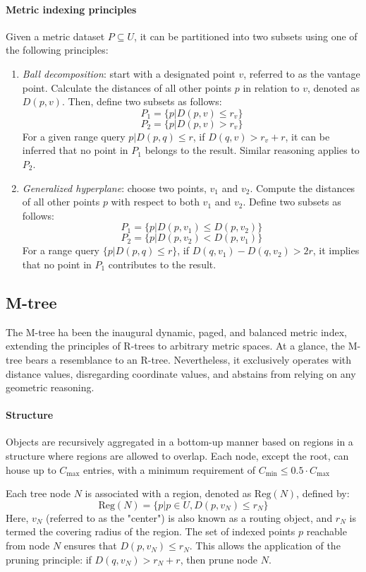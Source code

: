 \paragraph*{Metric indexing principles}
Given a metric dataset $P \subseteq U$, it can be partitioned into two subsets using one of the following principles:
\begin{enumerate}
    \item \textit{Ball decomposition}: start with a designated point $v$, referred to as the vantage point. 
        Calculate the distances of all other points $p$ in relation to $v$, denoted as $D(p,v)$. 
        Then, define two subsets as follows:
        \[P_1=\{p|D(p,v)\leq r_v\}\]
        \[P_2= \{p|D(p,v)>r_v\}\]
        For a given range query ${p|D(p,q)\leq r}$, if $D(q,v)>r_v+r$, it can be inferred that no point in $P_1$ belongs to the result. 
        Similar reasoning applies to $P_2$.
    \item \textit{Generalized hyperplane}: choose two points, $v_1$ and $v_2$. 
        Compute the distances of all other points $p$ with respect to both $v_1$ and $v_2$.     
        Define two subsets as follows:
        \[P_1=\{p|D(p,v_1)\leq D(p,v_2)\}\]
        \[P_2=\{p|D(p,v_2)<D(p,v_1)\}\]
        For a range query $\{p|D(p,q)\leq r\}$, if $D(q,v_1)-D(q,v_2)>2r$, it implies that no point in $P_1$ contributes to the result.
\end{enumerate}

\subsection{M-tree}
The M-tree ha been the inaugural dynamic, paged, and balanced metric index, extending the principles of R-trees to arbitrary metric spaces.
At a glance, the M-tree bears a resemblance to an R-tree. 
Nevertheless, it exclusively operates with distance values, disregarding coordinate values, and abstains from relying on any geometric reasoning.

\paragraph*{Structure}
Objects are recursively aggregated in a bottom-up manner based on regions in a structure where regions are allowed to overlap. 
Each node, except the root, can house up to $C_{\text{max}}$ entries, with a minimum requirement of $C_{\text{min}} \leq 0.5\cdot C_{\text{max}}$

Each tree node $N$ is associated with a region, denoted as $\text{Reg}(N)$, defined by:
\[\text{Reg}(N)=\{p|p\in U,D(p,v_N) \leq r_N\}\]
Here, $v_N$ (referred to as the "center") is also known as a routing object, and $r_N$ is termed the covering radius of the region. 
The set of indexed points $p$ reachable from node $N$ ensures that $D(p,v_N) \leq r_N$. 
This allows the application of the pruning principle: if $D(q,v_N)>r_N+r$, then prune node $N$.

